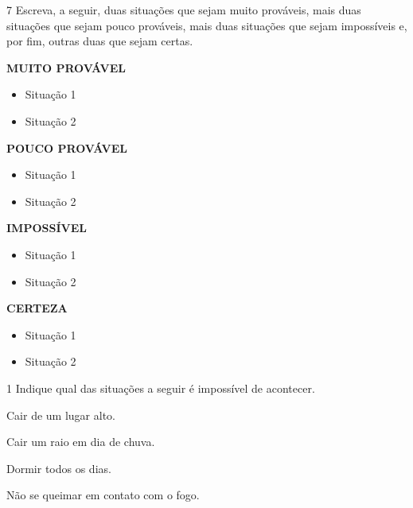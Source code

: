 \num{7} Escreva, a seguir, duas situações que sejam muito prováveis, mais duas
situações que sejam pouco prováveis, mais duas situações que sejam
impossíveis e, por fim, outras duas que sejam certas.



\textbf{MUITO PROVÁVEL}

\begin{itemize}
\item Situação 1
\end{itemize}

\begin{itemize}
\item Situação 2
\end{itemize}

\textbf{POUCO PROVÁVEL}

\begin{itemize}
\item Situação 1
\end{itemize}

\begin{itemize}
\item Situação 2
\end{itemize}

\textbf{IMPOSSÍVEL}

\begin{itemize}
\item Situação 1
\end{itemize}

\begin{itemize}
\item Situação 2
\end{itemize}

\textbf{CERTEZA}

\begin{itemize}
\item Situação 1
\end{itemize}

\begin{itemize}
\item Situação 2
\end{itemize}


\num{1} Indique qual das situações a seguir é impossível de acontecer.

\begin{escolha}
\item Cair de um lugar alto.

\item Cair um raio em dia de chuva.

\item Dormir todos os dias.

\item Não se queimar em contato com o fogo.
\end{escolha}

